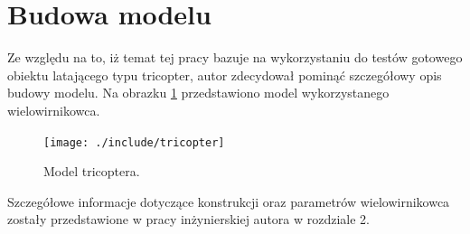 \section{Budowa modelu}
Ze względu na to, iż temat tej pracy bazuje na wykorzystaniu do testów gotowego obiektu latającego typu tricopter, autor zdecydował pominąć szczegółowy opis budowy modelu. Na obrazku \ref{pic:tricopter} przedstawiono model wykorzystanego wielowirnikowca.

\begin{figure}[!htbp]
\centering
\texttt{[image: ./include/tricopter]}
\caption{Model tricoptera.}
\label{pic:tricopter}
\end{figure}

Szczegółowe informacje dotyczące konstrukcji oraz parametrów wielowirnikowca zostały przedstawione w pracy inżynierskiej autora w rozdziale 2. %



